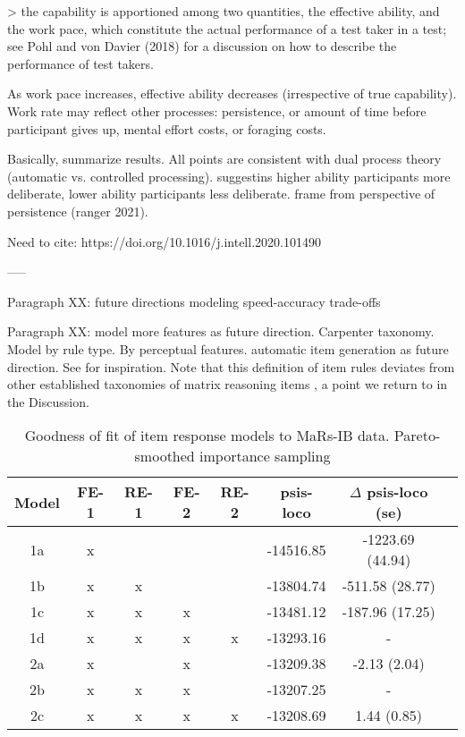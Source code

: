 \documentclass[a4paper,man,natbib]{apa6}
\begin{document}
> the capability is apportioned among two quantities, the effective ability, and the work pace, which constitute the actual performance of a test taker in a test; see Pohl and von Davier (2018) for a discussion on how to describe the performance of test takers. 

As work pace increases, effective ability decreases (irrespective of true capability). Work rate may reflect other processes: persistence, or amount of time before participant gives up, mental effort costs, or foraging costs.  

Basically, summarize results. All points are consistent with dual process theory (automatic vs. controlled processing). suggestins higher ability participants more deliberate, lower ability participants less deliberate. frame from perspective of persistence (ranger 2021).

Need to cite: https://doi.org/10.1016/j.intell.2020.101490

-----

Paragraph XX: future directions modeling speed-accuracy trade-offs

Paragraph XX: model more features as future direction. Carpenter taxonomy. Model by rule type. By perceptual features. automatic item generation as future direction. See \cite{lathrop2017item} for inspiration. Note that this definition of item rules deviates from other established taxonomies of matrix reasoning items \citep{carpenter1990one}, a point we return to in the Discussion.



\begin{table}
    \centering
    \begin{tabular}{c|c|c|c|c|c|c|c}
    \hline
    Model & FE-1 & RE-1 & FE-2 & RE-2 & psis-loco & $\Delta$ psis-loco (se) \\
    \hline
    1a & x &   &   &   & -14516.85 & -1223.69 (44.94)\\
    1b & x & x &   &   & -13804.74 & -511.58 (28.77) \\
    1c & x & x & x &   & -13481.12 & -187.96 (17.25) \\
    1d & x & x & x & x & -13293.16 & - \\
    \hline
    2a & x &   & x &   & -13209.38 & -2.13 (2.04) \\
    2b & x & x & x &   & -13207.25 & - \\
    2c & x & x & x & x & -13208.69 & 1.44 (0.85) \\
    \hline
    \end{tabular}
    \caption{\label{tab:1} Goodness of fit of item response models to MaRs-IB data. Pareto-smoothed importance sampling}
    \label{table:1}
\end{table}
\end{document}
